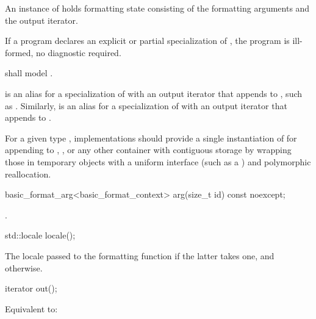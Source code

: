 \pnum
An instance of  holds formatting state
consisting of the formatting arguments and the output iterator.

\pnum
If a program declares an explicit or partial specialization of
,
the program is ill-formed, no diagnostic required.

\pnum
{} shall model .

\pnum
{}%
 is an alias for
a specialization of 
with an output iterator
that appends to ,
such as .
%
Similarly,  is an alias for
a specialization of 
with an output iterator
that appends to .

\pnum
\recommended
For a given type ,
implementations should provide
a single instantiation of 
for appending to
,
,
or any other container with contiguous storage
by wrapping those in temporary objects with a uniform interface
(such as a ) and polymorphic reallocation.

%
\begin{itemdecl}
basic_format_arg<basic_format_context> arg(size_t id) const noexcept;
\end{itemdecl}

\begin{itemdescr}
\pnum
\returns
{}.
\end{itemdescr}

%
\begin{itemdecl}
std::locale locale();
\end{itemdecl}

\begin{itemdescr}
\pnum
\returns
The locale passed to the formatting function
if the latter takes one,
and  otherwise.
\end{itemdescr}

%
\begin{itemdecl}
iterator out();
\end{itemdecl}

\begin{itemdescr}
\pnum
\effects
Equivalent to: 
\end{itemdescr}


